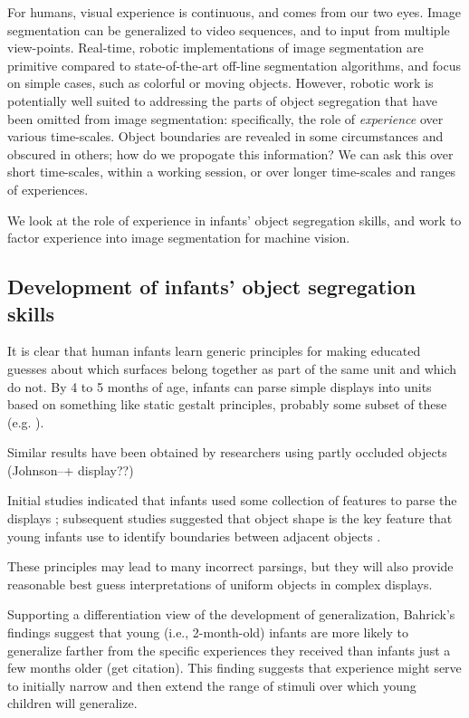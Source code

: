 For humans, visual experience is continuous, and comes from our two
eyes.  Image segmentation can be generalized to video sequences, and
to input from multiple view-points.  Real-time, robotic
implementations of image segmentation are primitive compared to
state-of-the-art off-line segmentation algorithms, and focus on simple
cases, such as colorful or moving objects.
%
However, robotic work is potentially well suited to addressing the
parts of object segregation that have been omitted from image
segmentation: specifically, the role of {\em experience} over
various time-scales.  Object boundaries are revealed in some
circumstances and obscured in others; how do we propogate this
information?  We can ask this over short time-scales, within
a working session, or over longer time-scales and ranges
of experiences.

We look at the role of experience in infants' object 
segregation skills, and work to factor experience into 
image segmentation for machine vision.


\subsection{Development of infants' object segregation skills}

It is clear that human infants learn generic principles for making
educated guesses about which surfaces belong together as part of the
same unit and which do not.  By 4 to 5 months of age, infants can
parse simple displays into units based on something like static
gestalt principles, probably some subset of these (e.g. ).

Similar results have been obtained by researchers using partly
occluded objects (Johnson--+ display??)

Initial studies indicated that infants used some collection of
features to parse the displays \cite{needham98infants,needham97object,needham98effects}; subsequent studies suggested that object shape is the key
feature that young infants use to identify boundaries between adjacent
objects \cite{needham99role}.

These principles may lead to many incorrect parsings, but they will
also provide reasonable best guess interpretations of uniform objects
in complex displays.  


Supporting a differentiation view of the development of
generalization, Bahrick's findings suggest that young (i.e.,
2-month-old) infants are more likely to generalize farther from the
specific experiences they received than infants just a few months
older (get citation).  This finding suggests that experience might
serve to initially narrow and then extend the range of stimuli over
which young children will generalize.


